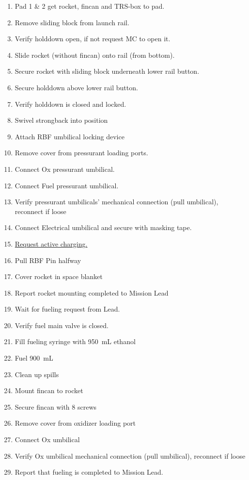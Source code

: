 \begin{enumerate}[label=P\arabic*.]
    \item \label{pad_rocket_mounting_start} Pad 1 \& 2 get rocket, fincan and TRS-box to pad.\checkbox
    \item Remove sliding block from launch rail.\checkbox
    \item Verify holddown open, if not request MC to open it.\checkbox
    \item Slide rocket (without fincan) onto rail (from bottom).\checkbox
    \item Secure rocket with sliding block underneath lower rail button.\checkbox
    \item Secure holddown above lower rail button.\checkbox
    \item Verify holddown is closed and locked.\checkbox
    \item Swivel strongback into position \checkbox
    \item Attach RBF umbilical locking device \checkbox
    \item Remove cover from pressurant loading ports.\checkbox
    \item Connect Ox pressurant umbilical.\checkbox
    \item Connect Fuel pressurant umbilical.\checkbox
    \item Verify pressurant umbilicals' mechanical connection (pull umbilical), reconnect if loose\checkbox
    \item Connect Electrical umbilical and secure with masking tape.\checkbox
    \item \underline{Request active charging.}\checkbox
    \item Pull RBF Pin halfway\checkbox
    \item Cover rocket in space blanket\checkbox
    \item \label{pad_rocket_mounting_end} Report rocket mounting completed to Mission Lead\checkbox
    
    \item \label{pad_fueling_start} Wait for fueling request from Lead.\checkbox
    \item Verify fuel main valve is closed.\checkbox
    \item Fill fueling syringe with \SI{950}{\milli\liter} ethanol\checkbox
    \item Fuel \SI{900}{\milli\liter} \checkbox
    \item Clean up spills\checkbox
    \item Mount fincan to rocket\checkbox
    \item Secure fincan with 8 screws\checkbox
    \item Remove cover from oxidizer loading port\checkbox
    \item Connect Ox umbilical\checkbox
    \item Verify Ox umbilical mechanical connection (pull umbilical), reconnect if loose\checkbox
    \item \label{pad_fueling_end} Report that fueling is completed to Mission Lead.\checkbox


\end{enumerate}
